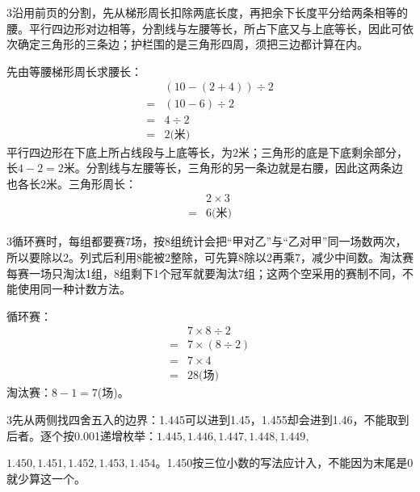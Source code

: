 \documentclass[multi=snippet,border={5bp 20bp 5bp 5bp}]{standalone}
\newenvironment{snippet}[3]{\begin{minipage}{#1bp}\color{answerred}\fontsize{#2}{#3}\selectfont\raggedright}{\end{minipage}}
\begin{document}
\begin{snippet}{505}{11.5}{14}\begin{multicols}{3}\raggedcolumns 沿用前页的分割，先从梯形周长扣除两底长度，再把余下长度平分给两条相等的腰。平行四边形对边相等，分割线与左腰等长，所占下底又与上底等长，因此可依次确定三角形的三条边；护栏围的是三角形四周，须把三边都计算在内。\par 先由等腰梯形周长求腰长：\[\begin{aligned}&(10-(2+4))\div2\\={}&(10-6)\div2\\={}&4\div2\\={}&2\text{(米)}\end{aligned}\]平行四边形在下底上所占线段与上底等长，为\(2\)\allowbreak 米；三角形的底是下底剩余部分，长\(4-2=2\)\allowbreak 米。分割线与左腰等长，三角形的另一条边就是右腰，因此这两条边也各长\(2\)\allowbreak 米。三角形周长：\[\begin{aligned}&2\times3\\={}&6\text{(米)}\end{aligned}\]\end{multicols}\end{snippet}
\begin{snippet}{505}{11.5}{14}\begin{multicols}{3}\raggedcolumns 循环赛时，每组都要赛7场，按8组统计会把“甲对乙”与“乙对甲”同一场数两次，所以要除以2。列式后利用8能被2整除，可先算8除以2再乘7，减少中间数。淘汰赛每赛一场只淘汰1组，8组剩下1个冠军就要淘汰7组；这两个空采用的赛制不同，不能使用同一种计数方法。\par 循环赛：\[\begin{aligned}&7\times8\div2\\={}&7\times(8\div2)\\={}&7\times4\\={}&28\text{(场)}\end{aligned}\]淘汰赛：\(8-1=7\)\allowbreak (场)。\end{multicols}\end{snippet}
\begin{snippet}{505}{11.5}{14}\begin{multicols}{3}\raggedcolumns 先从两侧找四舍五入的边界：1.445可以进到1.45，1.455却会进到1.46，不能取到后者。逐个按0.001递增枚举：\(1.445,\allowbreak 1.446,\allowbreak 1.447,\allowbreak 1.448,\allowbreak 1.449,\allowbreak \)\allowbreak \par \(1.450,\allowbreak 1.451,\allowbreak 1.452,\allowbreak 1.453,\allowbreak 1.454\)\allowbreak 。1.450按三位小数的写法应计入，不能因为末尾是0就少算这一个。\end{multicols}\end{snippet}
\end{document}
